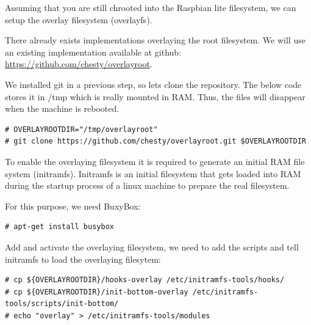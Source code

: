 %
%
%
%

Assuming that you are still chrooted into the Raspbian lite filesystem, we
can setup the overlay filesystem (overlayfs).

There already exists implementations overlaying the root filesystem. We will
use an existing implementation
available at github: \url{https://github.com/chesty/overlayroot}.

We installed git in a previous step, so lets clone the repository. The below
code stores it in /tmp which is really mounted in \ac{RAM}. Thus, the files
will disappear when the machine is rebooted.

\begin{lstlisting}[]
# OVERLAYROOTDIR="/tmp/overlayroot"
# git clone https://github.com/chesty/overlayroot.git $OVERLAYROOTDIR
\end{lstlisting}
\FloatBarrier

To enable the overlaying filesystem it is required to generate an initial \ac{RAM}
file system (initramfs). Initramfs is an initial filesystem that gets loaded into
\ac{RAM} during the startup process of a linux machine to prepare the real
filesystem.

For this purpose, we need BuxyBox:

\begin{lstlisting}[]
# apt-get install busybox
\end{lstlisting}
\FloatBarrier

Add and activate the overlaying filesystem, we need to add the scripts and tell initramfs
to load the overlaying filesytem:

\begin{lstlisting}[]
# cp ${OVERLAYROOTDIR}/hooks-overlay /etc/initramfs-tools/hooks/
# cp ${OVERLAYROOTDIR}/init-bottom-overlay /etc/initramfs-tools/scripts/init-bottom/
# echo "overlay" > /etc/initramfs-tools/modules
\end{lstlisting}
\FloatBarrier

